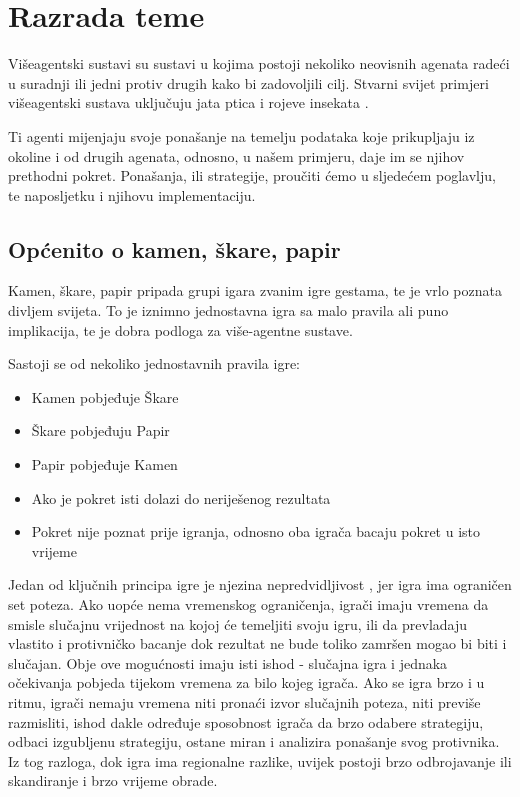 \documentclass{foi}
\begin{document}
\chapter{Razrada teme}

Višeagentski sustavi su sustavi u kojima postoji nekoliko neovisnih agenata radeći u suradnji ili jedni protiv drugih kako bi zadovoljili cilj. Stvarni svijet
primjeri višeagentski sustava uključuju jata ptica i rojeve insekata \cite{RPS2006}. 

Ti agenti mijenjaju svoje ponašanje na temelju podataka koje prikupljaju iz okoline i od drugih agenata, odnosno, u našem primjeru, daje im se njihov prethodni pokret.
Ponašanja, ili strategije, proučiti ćemo u sljedećem poglavlju, te naposljetku i njihovu implementaciju.

\section{Općenito o kamen, škare, papir}

Kamen, škare, papir pripada grupi igara zvanim igre gestama, te je vrlo poznata divljem svijeta. To je iznimno jednostavna igra sa malo pravila ali puno implikacija, te je dobra podloga za više-agentne sustave.

Sastoji se od nekoliko jednostavnih pravila igre:
\begin{itemize}
    \item Kamen pobjeđuje Škare
    \item Škare pobjeđuju Papir
    \item Papir pobjeđuje Kamen
    \item Ako je pokret isti dolazi do neriješenog rezultata
    \item Pokret nije poznat prije igranja, odnosno oba igrača bacaju pokret u isto vrijeme
\end{itemize}

Jedan od ključnih principa igre je njezina nepredvidljivost \cite{towardsAI2020}, jer igra ima ograničen set poteza. 
Ako uopće nema vremenskog ograničenja, igrači imaju vremena da smisle  slučajnu vrijednost na kojoj će temeljiti svoju igru, ili da prevladaju vlastito i protivničko bacanje dok rezultat ne bude toliko zamršen mogao bi biti i slučajan. Obje ove mogućnosti imaju isti ishod - slučajna igra i jednaka očekivanja pobjeda tijekom vremena za bilo kojeg igrača.
Ako se igra brzo i u ritmu, igrači nemaju vremena niti pronaći izvor slučajnih poteza, niti previše razmisliti, ishod dakle određuje sposobnost igrača da brzo odabere strategiju, odbaci izgubljenu strategiju, ostane miran i analizira ponašanje svog protivnika.
Iz tog razloga, dok igra ima regionalne razlike, uvijek postoji brzo odbrojavanje ili skandiranje i brzo vrijeme obrade. 
\end{document}
